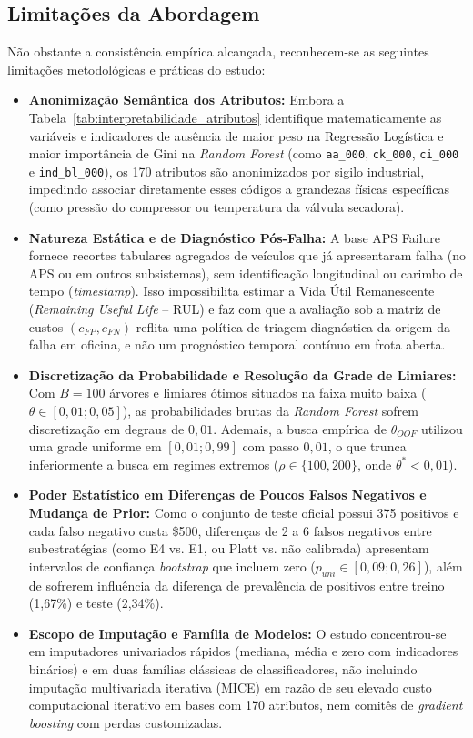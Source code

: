 \documentclass[conference]{IEEEtran}
\begin{document}
\subsection{Limitações da Abordagem}

Não obstante a consistência empírica alcançada, reconhecem-se as seguintes limitações metodológicas e práticas do estudo:
\begin{itemize}
    \item \textbf{Anonimização Semântica dos Atributos:} Embora a Tabela~\ref{tab:interpretabilidade_atributos} identifique matematicamente as variáveis e indicadores de ausência de maior peso na Regressão Logística e maior importância de Gini na \textit{Random Forest} (como \texttt{aa\_000}, \texttt{ck\_000}, \texttt{ci\_000} e \texttt{ind\_bl\_000}), os 170 atributos são anonimizados por sigilo industrial, impedindo associar diretamente esses códigos a grandezas físicas específicas (como pressão do compressor ou temperatura da válvula secadora).
    \item \textbf{Natureza Estática e de Diagnóstico Pós-Falha:} A base APS Failure fornece recortes tabulares agregados de veículos que já apresentaram falha (no APS ou em outros subsistemas), sem identificação longitudinal ou carimbo de tempo (\textit{timestamp}). Isso impossibilita estimar a Vida Útil Remanescente (\textit{Remaining Useful Life} -- RUL) e faz com que a avaliação sob a matriz de custos $(c_{FP}, c_{FN})$ reflita uma política de triagem diagnóstica da origem da falha em oficina, e não um prognóstico temporal contínuo em frota aberta.
    \item \textbf{Discretização da Probabilidade e Resolução da Grade de Limiares:} Com $B = 100$ árvores e limiares ótimos situados na faixa muito baixa ($\theta \in [0{,}01; 0{,}05]$), as probabilidades brutas da \textit{Random Forest} sofrem discretização em degraus de $0{,}01$. Ademais, a busca empírica de $\theta_{OOF}$ utilizou uma grade uniforme em $[0{,}01; 0{,}99]$ com passo $0{,}01$, o que trunca inferiormente a busca em regimes extremos ($\rho \in \{100, 200\}$, onde $\theta^* < 0{,}01$).
    \item \textbf{Poder Estatístico em Diferenças de Poucos Falsos Negativos e Mudança de Prior:} Como o conjunto de teste oficial possui 375 positivos e cada falso negativo custa \$500, diferenças de 2 a 6 falsos negativos entre subestratégias (como E4 vs. E1, ou Platt vs. não calibrada) apresentam intervalos de confiança \textit{bootstrap} que incluem zero ($p_{uni} \in [0{,}09; 0{,}26]$), além de sofrerem influência da diferença de prevalência de positivos entre treino (1,67\%) e teste (2,34\%).
    \item \textbf{Escopo de Imputação e Família de Modelos:} O estudo concentrou-se em imputadores univariados rápidos (mediana, média e zero com indicadores binários) e em duas famílias clássicas de classificadores, não incluindo imputação multivariada iterativa (MICE) em razão de seu elevado custo computacional iterativo em bases com 170 atributos, nem comitês de \textit{gradient boosting} com perdas customizadas.
\end{itemize}
\end{document}
